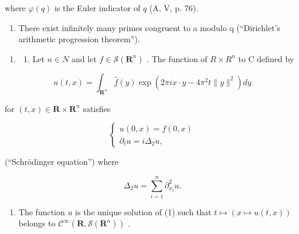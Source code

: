 where \(\varphi(q)\) is the Euler indicator of \(q\) (A, V, p. 76).

\begin{enumerate}
\def\labelenumi{\alph{enumi})}
\setcounter{enumi}{5}
\tightlist
\item
  There exist infinitely many primes congruent to a modulo q (“Dirichlet's arithmetic progression theorem”).
\end{enumerate}

\begin{enumerate}
\def\labelenumi{\arabic{enumi})}
\setcounter{enumi}{17}
\tightlist
\item
  \begin{enumerate}
  \def\labelenumii{\alph{enumii})}
  \tightlist
  \item
    Let \(n \in N\) and let \(f \in \mathcal{S}(\mathbf{R}^{n})\) . The function of \(R \times R^{n}\) to C defined by
  \end{enumerate}
\end{enumerate}

\[
u (t, x) = \int_ {\mathbf {R} ^ {n}} \widehat {f} (y) \exp (2 \pi i x \cdot y - 4 \pi^ {2} t \| y \| ^ {2}) d y
\]

for \((t,x)\in\mathbf{R}\times\mathbf{R}^{n}\) satisfies

\[
\left\{ \begin{array}{l} u (0, x) = f (0, x) \\ \partial_ {t} u = i \Delta_ {2} u, \end{array} \right.\tag{1}
\]

(“Schrödinger equation”) where

\[
\Delta_ {2} u = \sum_ {i = 1} ^ {n} \partial_ {x _ {i}} ^ {2} u.
\]

\begin{enumerate}
\def\labelenumi{\alph{enumi})}
\setcounter{enumi}{1}
\tightlist
\item
  The function \(u\) is the unique solution of (1) such that \(t \mapsto (x \mapsto u(t,x))\) belongs to \(\mathcal{C}^{\infty}(\mathbf{R},\mathcal{S}(\mathbf{R}^{n}))\) .
\end{enumerate}

